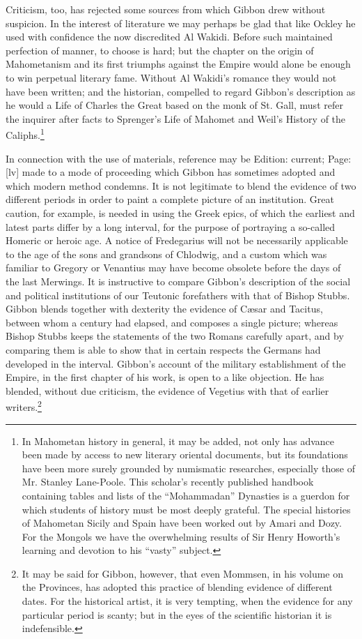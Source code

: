 Criticism, too, has rejected some sources from which Gibbon drew without suspicion. In the interest of literature we may perhaps be glad that like Ockley he used with confidence the now discredited Al Wakidi. Before such maintained perfection of manner, to choose is hard; but the chapter on the origin of Mahometanism and its first triumphs against the Empire would alone be enough to win perpetual literary fame. Without Al Wakidi\texthebrew{}’s romance they would not have been written; and the historian, compelled to regard Gibbon\texthebrew{}’s description as he would a Life of Charles the Great based on the monk of St. Gall, must refer the inquirer after facts to Sprenger\texthebrew{}’s Life of Mahomet and Weil\texthebrew{}’s History of the Caliphs.\footnote{In Mahometan history in general, it may be added, not only has advance been made by access to new literary oriental documents, but its foundations have been more surely grounded by numismatic researches, especially those of Mr. Stanley Lane-Poole. This scholar\texthebrew{}’s recently published handbook containing tables and lists of the \texthebrew{“}Mohammadan\texthebrew{}” Dynasties is a guerdon for which students of history must be most deeply grateful. The special histories of Mahometan Sicily and Spain have been worked out by Amari and Dozy. For the Mongols we have the overwhelming results of Sir Henry Howorth\texthebrew{}’s learning and devotion to his \texthebrew{“}vasty\texthebrew{}” subject.}

In connection with the use of materials, reference may be Edition: current; Page: [lv] made to a mode of proceeding which Gibbon has sometimes adopted and which modern method condemns. It is not legitimate to blend the evidence of two different periods in order to paint a complete picture of an institution. Great caution, for example, is needed in using the Greek epics, of which the earliest and latest parts differ by a long interval, for the purpose of portraying a so-called Homeric or heroic age. A notice of Fredegarius will not be necessarily applicable to the age of the sons and grandsons of Chlodwig, and a custom which was familiar to Gregory or Venantius may have become obsolete before the days of the last Merwings. It is instructive to compare Gibbon\texthebrew{}’s description of the social and political institutions of our Teutonic forefathers with that of Bishop Stubbs. Gibbon blends together with dexterity the evidence of Cæsar and Tacitus, between whom a century had elapsed, and composes a single picture; whereas Bishop Stubbs keeps the statements of the two Romans carefully apart, and by comparing them is able to show that in certain respects the Germans had developed in the interval. Gibbon\texthebrew{}’s account of the military establishment of the Empire, in the first chapter of his work, is open to a like objection. He has blended, without due criticism, the evidence of Vegetius with that of earlier writers.\footnote{It may be said for Gibbon, however, that even Mommsen, in his volume on the Provinces, has adopted this practice of blending evidence of different dates. For the historical artist, it is very tempting, when the evidence for any particular period is scanty; but in the eyes of the scientific historian it is indefensible.}


